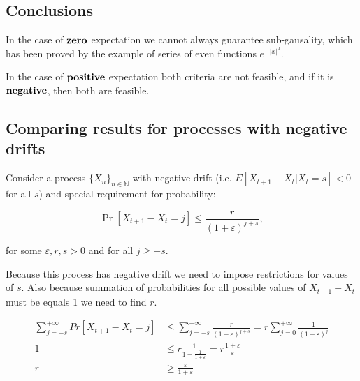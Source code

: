 \documentclass[12pt, a4paper]{article}
\theoremstyle{remark}
\theoremstyle{definition}
\newcommand{\expx}[1]{e^{-|x|^{#1}}}
\begin{document}
\begin{figure}[h!]
\begin{center}
    \end{center}
\end{figure}

\subsection*{Conclusions}

In the case of $\textbf{\text{zero}}$ expectation we cannot always guarantee sub-gausality, which has been proved by the example of series of even functions $\expx{a}$.

In the case of $\textbf{\text{positive}}$ expectation both criteria are not feasible, and if it is $\textbf{\text{negative}}$, then both are feasible.

\subsection{Comparing results for processes with negative drifts}

Consider a process \( \{ X_n \}_{n \in \mathbb{N}}\) with negative drift (i.e. \(E[X_{t + 1} - X_{t} | X_t = s] < 0\) for all \(s\)) and special requirement for probability:

\[
    \Pr[X_{t + 1} - X_{t} = j] \leq \frac{r}{(1 + \varepsilon)^{j + s}},
\]

for some \(\varepsilon, r, s > 0\) and for all \(j \geq -s\).

Because this process has negative drift we need to impose restrictions for values of \(s\). Also because summation of probabilities for all possible values of \(X_{t + 1} - X_{t}\) must be equals 1 we need to find \(r\).

\begin{align*}
    \sum_{j = -s}^{+\infty} Pr[X_{t + 1} - X_t = j] &\leq \sum_{j = -s}^{+\infty} \frac{r}{(1 + \varepsilon)^{j + s}} = r \sum_{j = 0}^{+\infty} \frac{1}{(1 + \varepsilon)^{j}} \\
    1 &\leq r \frac{1}{1 - \frac{1}{1 + \varepsilon}} = r \frac{1 + \varepsilon}{\varepsilon} \\
    r &\geq \frac{\varepsilon}{1 + \varepsilon} 
\end{align*}
\end{document}

